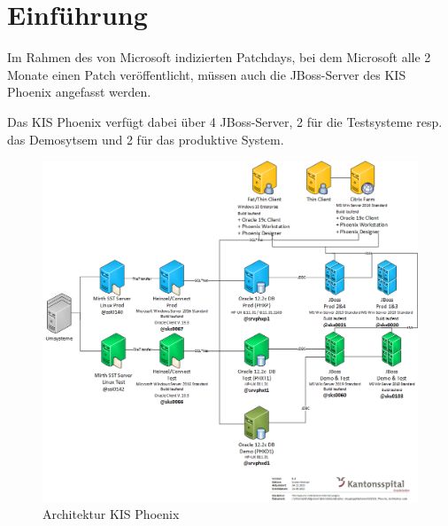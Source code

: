 
\chapter{Einführung}
Im Rahmen des von Microsoft indizierten Patchdays, bei dem Microsoft alle 2 Monate einen Patch veröffentlicht, müssen auch die \Gls{JBoss}-Server des KIS Phoenix angefasst werden.

Das KIS Phoenix verfügt dabei über 4 JBoss-Server, 2 für die Testsysteme resp.
das Demosytsem und 2 für das produktive System.
\begin{figure}[H]
    \centering
    \includegraphics[width=1\linewidth]{source/introduction/KIS_Phoenix_Architektur}
    \caption{Architektur KIS Phoenix\cite{KFDFYH5H}}
    \label{fig:architektur-kis-phoenix}
\end{figure}

